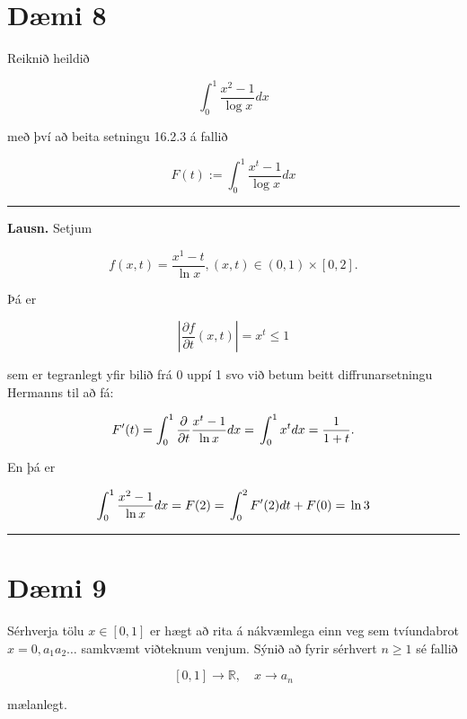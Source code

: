 \documentclass[]{book}
\begin{document}
\hypertarget{dmi-8-2}{%
\section*{Dæmi 8}\label{dmi-8-2}}

Reiknið heildið

\[
\int_0^1\frac{x^2-1}{\log x}dx
\]

með því að beita setningu 16.2.3 á fallið

\[
F(t) := \int_0^1\frac{x^t-1}{\log x}dx
\]

\begin{center}\rule{0.5\linewidth}{\linethickness}\end{center}

\textbf{Lausn.} Setjum

\[
f(x,t) = \frac{x^1 - t}{\ln x}, (x,t)\in(0,1)\times[0,2].
\]

Þá er

\[
|\frac{\partial f}{\partial t}(x,t)|=x^t \leq 1
\]

sem er tegranlegt yfir bilið frá 0 uppí 1 svo við betum beitt diffrunarsetningu Hermanns til að fá:

\[
F'(t) = \int_0^1 \frac{\partial}{\partial t}\frac{x^t - 1}{\ln x}dx =\\
\int_0^1x^tdx = \\
\frac{1}{1+t}.
\]

En þá er

\[
\int_0^1 \frac{x^2 - 1}{\ln x}dx = \\
F(2) = \\
\int_0^2 F'(2)dt + F(0) = \\
\ln 3
\]

\begin{center}\rule{0.5\linewidth}{\linethickness}\end{center}

\hypertarget{dmi-9-2}{%
\section*{Dæmi 9}\label{dmi-9-2}}

Sérhverja tölu \(x\in[0,1]\) er hægt að rita á nákvæmlega einn veg sem tvíundabrot \(x=0,a_1a_2\dots\) samkvæmt viðteknum venjum. Sýnið að fyrir sérhvert \(n\geq 1\) sé fallið

\[
[0,1] \rightarrow\mathbb R, \quad x\rightarrow a_n
\]

mælanlegt.
\end{document}
